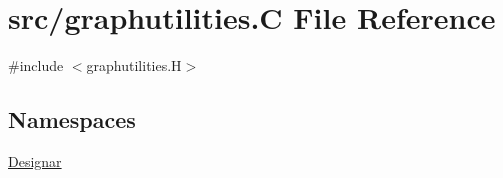 \hypertarget{graphutilities_8_c}{}\section{src/graphutilities.C File Reference}
\label{graphutilities_8_c}
{\ttfamily \#include $<$graphutilities.\+H$>$}\newline
\subsection*{Namespaces}
\begin{DoxyCompactItemize}
\item 
 \hyperlink{namespace_designar}{Designar}
\end{DoxyCompactItemize}
